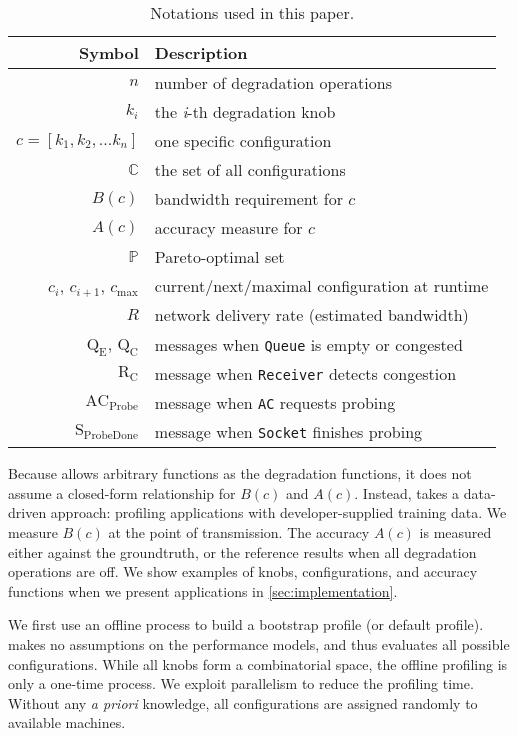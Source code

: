 \begin{table}
  \small
  \centering
  \begin{tabular}{r l}
    \toprule
    \textbf{Symbol} & \textbf{Description} \\
    \midrule
    $n$ & number of degradation operations \\
    $k_i$ & the \textit{i}-th degradation knob \\
    $c = [k_{1}, k_{2}, ... k_{n}]$ & one specific configuration \\
    $\mathbb{C}$ & the set of all configurations \\
    \midrule
    $B(c)$ & bandwidth requirement for $c$ \\
    $A(c)$ & accuracy measure for $c$ \\
    $\mathbb{P}$ & Pareto-optimal set \\
    \midrule
    $c_i$, $c_{i+1}$, $c_{\max}$ & current/next/maximal configuration at runtime \\
    $R$ & network delivery rate (estimated bandwidth) \\
    $\text{Q}_\text{E}$, $\text{Q}_\text{C}$ & messages when \texttt{Queue} is empty or congested \\
    $\text{R}_\text{C}$ & message when \texttt{Receiver} detects congestion \\
    $\text{AC}_\text{Probe}$ & message when \texttt{AC} requests probing \\
    $\text{S}_\text{ProbeDone}$ & message when \texttt{Socket} finishes probing \\
    \bottomrule
  \end{tabular}
  \vspace{0.3em}
  \caption{Notations used in this paper.}
  \label{tab:notations}
  \vspace{-3em}
\end{table}

Because \sysname{} allows arbitrary functions as the degradation functions, it
does not assume a closed-form relationship for $B(c)$ and $A(c)$. Instead,
\sysname{} takes a data-driven approach: profiling applications with
developer-supplied training data.  We measure $B(c)$ at the point of
transmission. The accuracy $A(c)$ is measured either against the groundtruth, or
the reference results when all degradation operations are off.  We show examples
of knobs, configurations, and accuracy functions when we present applications in
\autoref{sec:implementation}.

 We first use an offline process to build a bootstrap
profile (or default profile).  \sysname{} makes no assumptions on the
performance models, and thus evaluates all possible configurations.  While all
knobs form a combinatorial space, the offline profiling is only a one-time
process.  We exploit parallelism to reduce the profiling time.  Without any
\textit{a priori} knowledge, all configurations are assigned randomly to
available machines.

